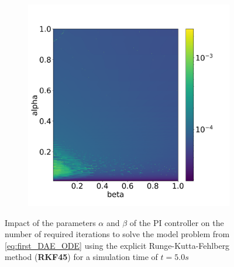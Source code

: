 \begin{figure}[H]
\begin{subfigure}{0.32\textwidth}
        \label{fig:numberIterationTSRKF45}
    \end{subfigure}
    \begin{subfigure}{0.32\textwidth}
    	\centering
    	\includegraphics[width=1\textwidth]{images/analysis_RKF45_psi.png}
        \label{fig:numberNumericalSchemeRKF45}
    \end{subfigure}
    \caption{Impact of the parameters $\alpha$ and $\beta$ of the PI controller on the number of required iterations to solve the model problem from \autoref{eq:first_DAE_ODE} using the explicit Runge-Kutta-Fehlberg method (\textbf{RKF45}) for a simulation time of $t=5.0s$}
    \label{fig:ParametersPIControllerRKF45}
\end{figure}


